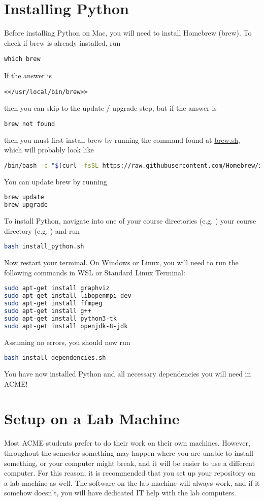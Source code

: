 \section*{Installing Python}
\ifwindows
\else
    Before installing Python on Mac, you will need to install Homebrew (brew).
    To check if brew is already installed, run
\begin{lstlisting}
which brew
\end{lstlisting}
    If the answer is 
\begin{lstlisting}
<</usr/local/bin/brew>>
\end{lstlisting}
    then you can skip to the update / upgrade step, but if the answer is
\begin{lstlisting}[language=bash]
brew not found
\end{lstlisting}
    then you must first install brew by running the command found at \href{brew.sh}{brew.sh}, which will probably look like
\begin{lstlisting}[language=bash]
/bin/bash -c "$(curl -fsSL https://raw.githubusercontent.com/Homebrew/install/HEAD/install.sh)"
\end{lstlisting}
    You can update brew by running
\begin{lstlisting}[language=bash]
brew update
brew upgrade
\end{lstlisting}
\fi

To install Python, navigate into
\ifbootcamp
one of your course directories (e.g. ) 
\else 
your course directory (e.g. )
\fi
and run 
\begin{lstlisting}[language=bash]
bash install_python.sh
\end{lstlisting}
Now restart your terminal.
On Windows or Linux, you will need to run the following commands in WSL or Standard Linux Terminal:
\begin{lstlisting}[language=bash]
sudo apt-get install graphviz
sudo apt-get install libopenmpi-dev
sudo apt-get install ffmpeg
sudo apt-get install g++
sudo apt-get install python3-tk
sudo apt-get install openjdk-8-jdk
\end{lstlisting}
Assuming no errors, you should now run
\begin{lstlisting}[language=bash]
bash install_dependencies.sh
\end{lstlisting}
You have now installed Python and all necessary dependencies you will need in ACME!

\ifbootcamp
\ifbyu
\section*{Setup on a Lab Machine}
Most ACME students prefer to do their work on their own machines.
However, throughout the semester something may happen where you are unable to install something, or your computer might break, and it will be easier to use a different computer.
For this reason, it is recommended that you set up your repository on a lab machine as well.
The software on the lab machine will always work, and if it somehow doesn't, you will have dedicated IT help with the lab computers.

